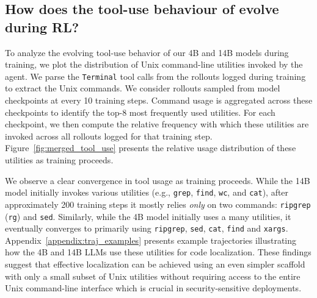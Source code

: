 \subsection{How does the tool-use behaviour of \methodname evolve during RL?}\label{sec:tool_use_behaviour}

To analyze the evolving tool-use behavior of our 4B and 14B models during training, we plot the distribution of Unix command-line utilities invoked by the agent. We parse the \texttt{Terminal} tool calls from the rollouts logged during training to extract the Unix commands. We consider rollouts sampled from model checkpoints at every 10 training steps. Command usage is aggregated across these checkpoints to identify the top-8 most frequently used utilities. For each checkpoint, we then compute the relative frequency with which these utilities are invoked across all rollouts logged for that training step. Figure~\ref{fig:merged_tool_use} presents the relative usage distribution of these utilities as training proceeds.

We observe a clear convergence in tool usage as training proceeds. While the 14B model initially invokes various utilities (e.g., \texttt{grep}, \texttt{find}, \texttt{wc}, and \texttt{cat}), after approximately 200 training steps it mostly relies \emph{only} on two commands: \texttt{ripgrep} (\texttt{rg}) and \texttt{sed}. Similarly, while the 4B model initially uses a many utilities, it eventually converges to primarily using \texttt{ripgrep}, \texttt{sed}, \texttt{cat}, \texttt{find} and \texttt{xargs}. Appendix~\ref{appendix:traj_examples} presents example trajectories illustrating how the 4B and 14B LLMs use these utilities for code localization. These findings suggest that effective localization can be achieved using an even simpler scaffold with only a small subset of Unix utilities without requiring access to the entire Unix command-line interface which is crucial in security-sensitive deployments.

